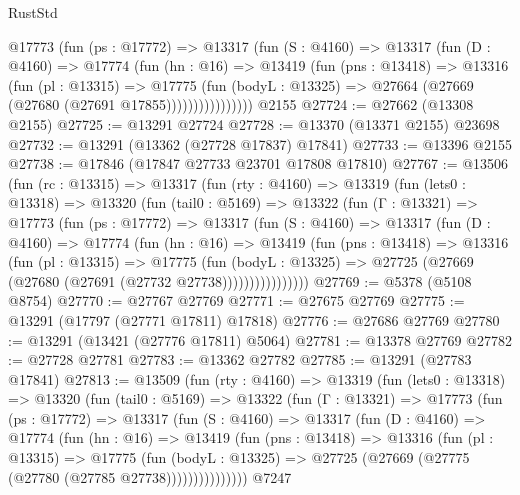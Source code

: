 \begin{lexlean}{RustStd}
\begin{coremodule}
              @17773
                (fun (ps : @17772) =>
                @13317
                  (fun (S : @4160) =>
                  @13317
                    (fun (D : @4160) =>
                    @17774
                      (fun (hn : @16) =>
                      @13419
                        (fun (pns : @13418) =>
                        @13316
                          (fun (pl : @13315) =>
                          @17775
                            (fun (bodyL : @13325) =>
                            @27664 (@27669 (@27680 (@27691 @17855))))))))))))))))
    @2155
@27724 := @27662 (@13308 @2155)
@27725 := @13291 @27724
@27728 := @13370 (@13371 @2155) @23698
@27732 := @13291 (@13362 (@27728 @17837) @17841)
@27733 := @13396 @2155
@27738 := @17846 (@17847 @27733 @23701 @17808 @17810)
@27767 := @13506
    (fun (rc : @13315) =>
    @13317
      (fun (rty : @4160) =>
      @13319
        (fun (lets0 : @13318) =>
        @13320
          (fun (tail0 : @5169) =>
          @13322
            (fun (Γ : @13321) =>
            @17773
              (fun (ps : @17772) =>
              @13317
                (fun (S : @4160) =>
                @13317
                  (fun (D : @4160) =>
                  @17774
                    (fun (hn : @16) =>
                    @13419
                      (fun (pns : @13418) =>
                      @13316
                        (fun (pl : @13315) =>
                        @17775
                          (fun (bodyL : @13325) =>
                          @27725 (@27669 (@27680 (@27691 (@27732 @27738))))))))))))))))
@27769 := @5378 (@5108 @8754)
@27770 := @27767 @27769
@27771 := @27675 @27769
@27775 := @13291 (@17797 (@27771 @17811) @17818)
@27776 := @27686 @27769
@27780 := @13291 (@13421 (@27776 @17811) @5064)
@27781 := @13378 @27769
@27782 := @27728 @27781
@27783 := @13362 @27782
@27785 := @13291 (@27783 @17841)
@27813 := @13509
    (fun (rty : @4160) =>
    @13319
      (fun (lets0 : @13318) =>
      @13320
        (fun (tail0 : @5169) =>
        @13322
          (fun (Γ : @13321) =>
          @17773
            (fun (ps : @17772) =>
            @13317
              (fun (S : @4160) =>
              @13317
                (fun (D : @4160) =>
                @17774
                  (fun (hn : @16) =>
                  @13419
                    (fun (pns : @13418) =>
                    @13316
                      (fun (pl : @13315) =>
                      @17775
                        (fun (bodyL : @13325) =>
                        @27725 (@27669 (@27775 (@27780 (@27785 @27738)))))))))))))))
    @7247

\end{coremodule}
\end{lexlean}

